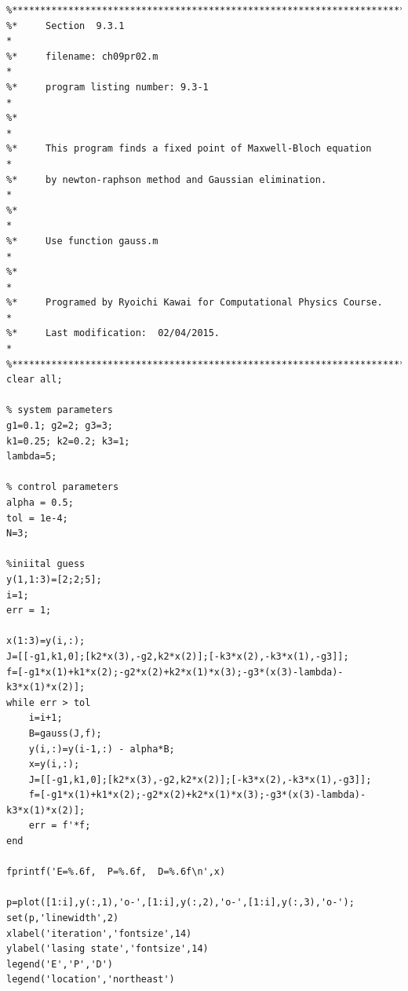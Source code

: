 \bigskip
\noindent
\program
\label{prog:fixed_point_maxwell}
\footnotesize
\begin{verbatim}
%**************************************************************************
%*     Section  9.3.1                                                     *
%*     filename: ch09pr02.m                                               *
%*     program listing number: 9.3-1                                      *
%*                                                                        *
%*     This program finds a fixed point of Maxwell-Bloch equation         *
%*     by newton-raphson method and Gaussian elimination.                 *
%*                                                                        *
%*     Use function gauss.m                                               *
%*                                                                        *
%*     Programed by Ryoichi Kawai for Computational Physics Course.       *
%*     Last modification:  02/04/2015.                                    *
%**************************************************************************
clear all;

% system parameters
g1=0.1; g2=2; g3=3;
k1=0.25; k2=0.2; k3=1;
lambda=5;

% control parameters
alpha = 0.5;
tol = 1e-4;
N=3;

%iniital guess
y(1,1:3)=[2;2;5];
i=1;
err = 1;

x(1:3)=y(i,:);
J=[[-g1,k1,0];[k2*x(3),-g2,k2*x(2)];[-k3*x(2),-k3*x(1),-g3]];
f=[-g1*x(1)+k1*x(2);-g2*x(2)+k2*x(1)*x(3);-g3*(x(3)-lambda)-k3*x(1)*x(2)];
while err > tol
    i=i+1;
    B=gauss(J,f);
    y(i,:)=y(i-1,:) - alpha*B;
    x=y(i,:);
    J=[[-g1,k1,0];[k2*x(3),-g2,k2*x(2)];[-k3*x(2),-k3*x(1),-g3]];
    f=[-g1*x(1)+k1*x(2);-g2*x(2)+k2*x(1)*x(3);-g3*(x(3)-lambda)-k3*x(1)*x(2)];
    err = f'*f;
end

fprintf('E=%.6f,  P=%.6f,  D=%.6f\n',x)

p=plot([1:i],y(:,1),'o-',[1:i],y(:,2),'o-',[1:i],y(:,3),'o-');
set(p,'linewidth',2)
xlabel('iteration','fontsize',14)
ylabel('lasing state','fontsize',14)
legend('E','P','D')
legend('location','northeast')
\end{verbatim}
\normalsize

\bigskip

